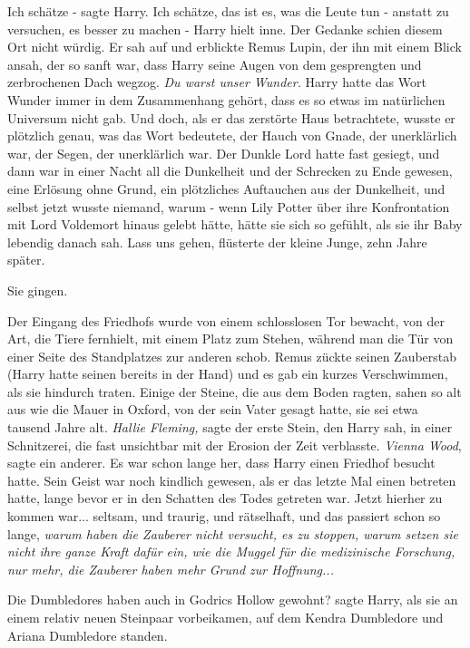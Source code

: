 \glqq Ich schätze -\grqq{} sagte Harry. \glqq Ich schätze, das ist es, was die
Leute tun - anstatt zu versuchen, es besser zu machen -\grqq{} Harry hielt inne.
Der Gedanke schien diesem Ort nicht würdig. Er sah auf und erblickte Remus
Lupin, der ihn mit einem Blick ansah, der so sanft war, dass Harry seine Augen
von dem gesprengten und zerbrochenen Dach wegzog. \emph{Du warst unser Wunder.}
Harry hatte das Wort \glqq Wunder\grqq{} immer in dem Zusammenhang gehört, dass
es so etwas im natürlichen Universum nicht gab. Und doch, als er das zerstörte
Haus betrachtete, wusste er plötzlich genau, was das Wort bedeutete, der Hauch
von Gnade, der unerklärlich war, der Segen, der unerklärlich war. Der Dunkle
Lord hatte fast gesiegt, und dann war in einer Nacht all die Dunkelheit und der
Schrecken zu Ende gewesen, eine Erlösung ohne Grund, ein plötzliches Auftauchen
aus der Dunkelheit, und selbst jetzt wusste niemand, warum - wenn Lily Potter
über ihre Konfrontation mit Lord Voldemort hinaus gelebt hätte, hätte sie sich
so gefühlt, als sie ihr Baby lebendig danach sah. \glqq Lass uns gehen\grqq{},
flüsterte der kleine Junge, zehn Jahre später.

Sie gingen.

Der Eingang des Friedhofs wurde von einem schlosslosen Tor bewacht, von der Art,
die Tiere fernhielt, mit einem Platz zum Stehen, während man die Tür von einer
Seite des Standplatzes zur anderen schob. Remus zückte seinen Zauberstab (Harry
hatte seinen bereits in der Hand) und es gab ein kurzes Verschwimmen, als sie
hindurch traten. Einige der Steine, die aus dem Boden ragten, sahen so alt aus
wie die Mauer in Oxford, von der sein Vater gesagt hatte, sie sei etwa tausend
Jahre alt. \emph{Hallie Fleming,} sagte der erste Stein, den Harry sah, in einer
Schnitzerei, die fast unsichtbar mit der Erosion der Zeit verblasste.
\emph{Vienna Wood}, sagte ein anderer. Es war schon lange her, dass Harry einen
Friedhof besucht hatte. Sein Geist war noch kindlich gewesen, als er das letzte
Mal einen betreten hatte, lange bevor er in den Schatten des Todes getreten war.
Jetzt hierher zu kommen war... seltsam, und traurig, und rätselhaft, und das
passiert schon so lange, \emph{warum haben die Zauberer nicht versucht, es zu
stoppen, warum setzen sie nicht ihre ganze Kraft dafür ein, wie die Muggel für
die medizinische Forschung, nur mehr, die Zauberer haben mehr Grund zur
Hoffnung... }

\glqq Die Dumbledores haben auch in Godrics Hollow gewohnt?\grqq{} sagte Harry,
als sie an einem relativ neuen Steinpaar vorbeikamen, auf dem Kendra Dumbledore
und Ariana Dumbledore standen.

